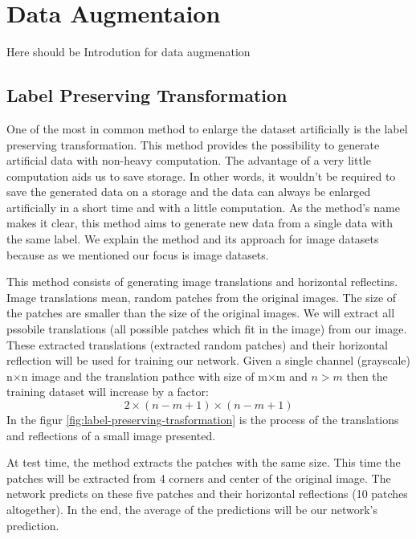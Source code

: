 \chapter{Data Augmentaion}
Here should be Introdution for data augmenation


\section{Label Preserving Transformation}
\label{tit:label-preserving}

One of the most in common method to enlarge the dataset artificially is the label preserving transformation. This method provides the possibility to generate artificial data with
non-heavy computation. The advantage of a very little computation aids us to save storage. In other
words, it wouldn't be required to save the generated data on a storage and the data can always be
enlarged artificially in a short time and with a little computation. As the method's name makes it
clear, this method aims to generate new data from a single data with the same label. We explain the method and its approach for image datasets because as we mentioned our focus is image datasets.

This method consists of generating image translations and horizontal reflectins. Image translations mean, random patches from the original images. The size of the patches are smaller than the
size of the original images. We will extract all pssobile translations (all possible patches which fit in the image) from our image.
These extracted translations (extracted random patches) and their horizontal reflection will be used
for training our network. Given a single channel (grayscale) n$\times$n image and the translation
pathce with size of m$\times$m and $n>m$ then the training dataset will increase by a factor: $$2\times(n-m+1)\times(n-m+1)$$ In the figur \ref{fig:label-preserving-trasformation} is the process of the translations
and reflections of a small image presented.

At test time, the method extracts the patches with the same size. This time the patches will be extracted from 4 corners and center of the original image. The network predicts on these
five patches and their horizontal reflections (10 patches altogether). In the end, the average
of the predictions will be our network's prediction.

